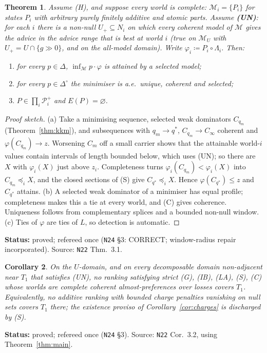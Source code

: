 \documentclass[11pt]{article}
\newtheorem{theorem}{Theorem}[section]
\newtheorem{corollary}[theorem]{Corollary}
\theoremstyle{definition}
\theoremstyle{remark}
\newcommand{\Di}{\Delta^{\circ}}
\newcommand{\M}{\mathcal M}
\newcommand{\src}[1]{\texttt{#1}}
\newcommand{\status}[1]{\par\smallskip\noindent\textbf{Status:} #1\par\smallskip}
\begin{document}
\begin{theorem}\label{thm:complete}
Assume (H), and suppose every world is complete: $\M_i=\{P_i\}$ for states $P_i$ with arbitrary purely finitely additive and atomic parts. Assume \textbf{(UN)}: for each $i$ there is a non-null $U_+\subseteq N_i$ on which every coherent model of $\M$ gives the advice in the advice range that is best at world $i$ (true on $\M_U$ with $U_+=U\cap\{g\gg0\}$, and on the all-model domain). Write $\varphi_i\coloneqq P_i\circ\Lambda_i$. Then:
\begin{enumerate}[leftmargin=*,label=(\alph*)]
\item for every $p\in\Delta$, $\inf_\M p\cdot\varphi$ is attained by a selected model;
\item for every $p\in\Di$ the minimiser is a.e.\ unique, coherent and selected;
\item $P\in\prod_i\mathcal P^+_i$ and $E(P)=\varnothing$.
\end{enumerate}
\end{theorem}
\begin{proof}[Proof sketch]
(a) Take a minimising sequence, selected weak dominators $C_{q_m}$ (Theorem~\ref{thm:kkm}), and subsequences with $q_m\to q^*$, $C_{q_m}\to C_\infty$ coherent and $\varphi(C_{q_m})\to z$. Worsening $C_m$ off a small carrier shows that the attainable world-$i$ values contain intervals of length bounded below, which uses (UN); so there are $X$ with $\varphi_i(X)$ just above $z_i$. Completeness turns $\varphi_i(C_{q_m})<\varphi_i(X)$ into $C_{q_m}\preceq_iX$, and the closed sections of (S) give $C_{q^*}\preceq_iX$. Hence $\varphi(C_{q^*})\le z$ and $C_{q^*}$ attains. (b) A selected weak dominator of a minimiser has equal profile; completeness makes this a tie at every world, and (C) gives coherence. Uniqueness follows from complementary splices and a bounded non-null window. (c) Ties of $\varphi$ are ties of $L$, so detection is automatic.
\end{proof}
\status{proved; refereed once (\src{N24} \S3: CORRECT; window-radius repair incorporated). Source: \src{N22} Thm.~3.1.}

\begin{corollary}\label{cor:complete}
On the $U$-domain, and on every decomposable domain non-adjacent near $T_1$ that satisfies (UN), no ranking satisfying strict (G), (IB), (LA), (S), (C) whose worlds are complete coherent almost-preferences over losses covers $T_1$. Equivalently, no additive ranking with bounded charge penalties vanishing on null sets covers $T_1$ there; the existence proviso of Corollary~\ref{cor:charges} is discharged by (S).
\end{corollary}
\status{proved; refereed once (\src{N24} \S3). Source: \src{N22} Cor.~3.2, using Theorem~\ref{thm:main}.}
\end{document}
